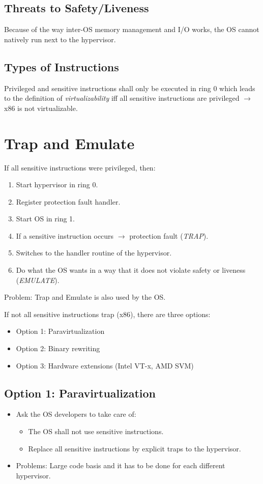 		\subsection{Threats to Safety/Liveness}
			Because of the way inter-OS memory management and I/O works, the OS cannot natively run next to the hypervisor.

		\subsection{Types of Instructions}
			Privileged and sensitive instructions shall only be executed in ring 0 which leads to the definition of \textit{virtualizability} iff all sensitive instructions are privileged \(\rightarrow\) x86 is not virtualizable.

	\section{Trap and Emulate}
		If all sensitive instructions were privileged, then:
		\begin{enumerate}
			\item Start hypervisor in ring 0.
			\item Register protection fault handler.
			\item Start OS in ring 1.
			\item If a sensitive instruction occurs \(\rightarrow\) protection fault (\textit{TRAP}).
			\item Switches to the handler routine of the hypervisor.
			\item Do what the OS wants in a way that it does not violate safety or liveness (\textit{EMULATE}).
		\end{enumerate}
		Problem: Trap and Emulate is also used by the OS.

		If not all sensitive instructions trap (x86), there are three options:
		\begin{itemize}
			\item Option 1: Paravirtualization
			\item Option 2: Binary rewriting
			\item Option 3: Hardware extensions (Intel VT-x, AMD SVM)
		\end{itemize}

		\subsection{Option 1: Paravirtualization}
			\begin{itemize}
				\item Ask the OS developers to take care of:
					\begin{itemize}
						\item The OS shall not use sensitive instructions.
						\item Replace all sensitive instructions by explicit traps to the hypervisor.
					\end{itemize}
				\item Problems: Large code basis and it has to be done for each different hypervisor.
			\end{itemize}

